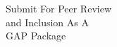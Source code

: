 \documentclass[preview]{standalone}
\begin{document}
\begin{center}
Submit For Peer Review \\ and Inclusion As A \\ GAP Package
\end{center}
\end{document}
